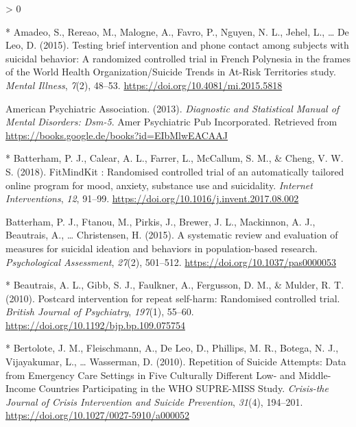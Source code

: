 \documentclass[
  english,
  man]{apa6}
\newlength{\cslhangindent}
\newenvironment{CSLReferences}[2] %
 {%
  \setlength{\parindent}{0pt}
  \ifodd #1 \everypar{\setlength{\hangindent}{\cslhangindent}}\ignorespaces\fi
  \ifnum #2 > 0
  \setlength{\parskip}{#2\baselineskip}
  \fi
 }%
 {}
\begin{document}
\hypertarget{refs}{}
\begin{CSLReferences}{1}{0}
\leavevmode\hypertarget{ref-amadeo2015}{}%
* Amadeo, S., Rereao, M., Malogne, A., Favro, P., Nguyen, N. L., Jehel, L., \ldots{} De Leo, D. (2015). Testing brief intervention and phone contact among subjects with suicidal behavior: A randomized controlled trial in {French Polynesia} in the frames of the {World Health Organization}/{Suicide Trends} in {At}-{Risk Territories} study. \emph{Mental Illness}, \emph{7}(2), 48--53. \url{https://doi.org/10.4081/mi.2015.5818}

\leavevmode\hypertarget{ref-americanpsychiatricassociation2013a}{}%
American Psychiatric Association. (2013). \emph{Diagnostic and {Statistical Manual} of {Mental Disorders}: Dsm-5}. {Amer Psychiatric Pub Incorporated}. Retrieved from \url{https://books.google.de/books?id=EIbMlwEACAAJ}

\leavevmode\hypertarget{ref-batterham2018}{}%
* Batterham, P. J., Calear, A. L., Farrer, L., McCallum, S. M., \& Cheng, V. W. S. (2018). {FitMindKit} : Randomised controlled trial of an automatically tailored online program for mood, anxiety, substance use and suicidality. \emph{Internet Interventions}, \emph{12}, 91--99. \url{https://doi.org/10.1016/j.invent.2017.08.002}

\leavevmode\hypertarget{ref-batterham2015}{}%
Batterham, P. J., Ftanou, M., Pirkis, J., Brewer, J. L., Mackinnon, A. J., Beautrais, A., \ldots{} Christensen, H. (2015). A systematic review and evaluation of measures for suicidal ideation and behaviors in population-based research. \emph{Psychological Assessment}, \emph{27}(2), 501--512. \url{https://doi.org/10.1037/pas0000053}

\leavevmode\hypertarget{ref-beautrais2010}{}%
* Beautrais, A. L., Gibb, S. J., Faulkner, A., Fergusson, D. M., \& Mulder, R. T. (2010). Postcard intervention for repeat self-harm: Randomised controlled trial. \emph{British Journal of Psychiatry}, \emph{197}(1), 55--60. \url{https://doi.org/10.1192/bjp.bp.109.075754}

\leavevmode\hypertarget{ref-bertolote2010}{}%
* Bertolote, J. M., Fleischmann, A., De Leo, D., Phillips, M. R., Botega, N. J., Vijayakumar, L., \ldots{} Wasserman, D. (2010). Repetition of {Suicide Attempts}: Data from {Emergency Care Settings} in {Five Culturally Different Low}- and {Middle}-{Income Countries Participating} in the {WHO SUPRE}-{MISS Study}. \emph{Crisis-the Journal of Crisis Intervention and Suicide Prevention}, \emph{31}(4), 194--201. \url{https://doi.org/10.1027/0027-5910/a000052}


\end{CSLReferences}
\end{document}

